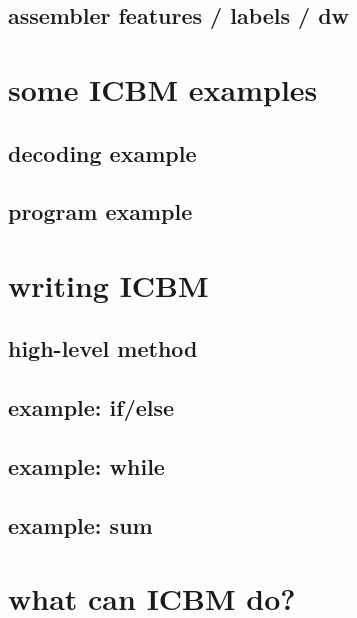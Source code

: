 

\subsection{assembler features / labels / dw}



\section{some ICBM examples}

\subsection{decoding example}


\subsection{program example}


\section{writing ICBM}

\subsection{high-level method}



\subsection{example: if/else}



\subsection{example: while}

\subsection{example: sum}



\section{what can ICBM do?}

